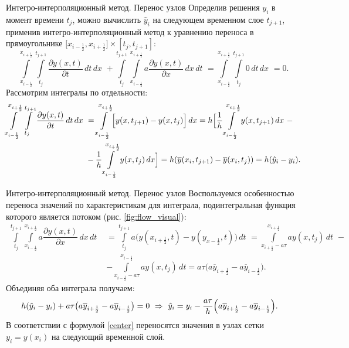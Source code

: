 \documentclass[unicode, 8pt]{beamer}
\newcommand{\picref}[1]{рис. \ref{#1}}
\newcommand{\half}{\frac{1}{2}}
\begin{document}
    \begin{frame}{Интегро-интерполяционный метод. Перенос узлов}
        Определив решения $y_i$ в момент времени $ t_j $, можно вычислить $ \hat y_i $ на следующем временном слое $ t_{j+1} $, применив интегро-интерполяционный метод к уравнению переноса в прямоугольнике $ \bigl[ x_{i-\half}, x_{i+\half} \bigr] \times [t_j, t_{j+1}] $:
        \[
            \displaystyle \int \limits_{x_{i-\half}}^{x_{i+\half}} \int \limits_{t_j}^{t_{j+1}} \dfrac{ \partial y(x, t) }{ \partial t } \, dt \, dx \,\, + \int \limits_{t_j}^{t_{j+1}} \int \limits_{x_{i-\half}}^{x_{i+\half}} a \dfrac{ \partial y(x,t) }{ \partial x } \, dx \, dt \,\, = \int \limits_{x_{i-\half}}^{x_{i+\half}} \int \limits_{t_j}^{t_{j+1}} 0 \, dt \, dx \, \, = 0.
        \]
        Рассмотрим интегралы по отдельности: 
        \[
            \begin{split}
                \int \limits_{x_{i-\half}}^{x_{i+\half}} \int \limits_{t_j}^{t_{j+1}} \dfrac{ \partial y(x, t) }{ \partial t } \, dt \, dx \,\, &= \int \limits_{x_{i-\half}}^{x_{i+\half}} \Bigl[ y(x, t_{j+1}) - y(x, t_j)  \Bigr] \, dx = h \Bigl[ \dfrac{1}{h} \int \limits_{x_{i-\half}}^{x_{i+\half}} y(x, t_{j+1}) \, dx \,\,  -  
                \\ 
                &- \dfrac{1}{h} \int \limits_{x_{i-\half}}^{x_{i+\half}} y(x, t_j) \, dx \Bigr] = h ( \overline y(x_i, t_{j+1}) - \overline y(x_i, t_j) ) = h( \hat y_i - y_i).
            \end{split}
        \]
    \end{frame}
 
     \begin{frame}{Интегро-интерполяционный метод. Перенос узлов}
        Воспользуемся особенностью переноса значений по характеристикам для интеграла, подинтегральная функция которого является потоком (\picref{fig:flow_visual}):
        \[
            \begin{split}
                \int \limits_{t_j}^{t_{j+1}} \int \limits_{x_{i-\half}}^{x_{i+\half}} a \dfrac{ \partial y(x,t) }{ \partial x } \, dx \, dt \,\, &= \int \limits_{t_j}^{t_{j+1}} a \bigl( y(x_{i+\half}, t) - y(y_{x-\half}, t) \bigr) \, dt \,\, =  \int \limits_{x_{i+\half}-a\tau}^{x_{i+\half}} a y(x, t_j) \, dt \,\, - \\
                &- \int \limits_{x_{i-\half}-a\tau}^{x_{i-\half}} a y(x, t_j) \, dt = a\tau\bigl( a \overline y_{i+\half} - a \overline y_{i-\half} \bigr).
            \end{split}
        \]
        Объединяя оба интеграла получаем:
        \begin{equation}
            \begin{split}
                h ( \hat y_i - y_i) &+ a\tau\bigl( a \overline y_{i+\half} - a \overline y_{i-\half} \bigr) = 0 \,\, \Rightarrow \,\, \hat y_i = y_i - \dfrac{ a\tau }{ h } \Bigl( a \overline y_{i+\half} - a \overline y_{i-\half} \Bigr).
            \end{split}
            \label{center}
        \end{equation}
        В соответствии с формулой \eqref{center} переносятся значения в узлах сетки $ y_i = y(x_i)$ на следующий временной слой.
     \end{frame}
 
\end{document}
